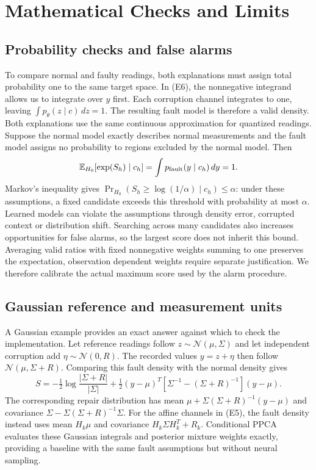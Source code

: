 \documentclass{llncs}
\newcommand{\E}{\mathbb{E}}
\newcommand{\1}{\mathbf{1}}
\begin{document}
\section{Mathematical Checks and Limits}

\subsection{Probability checks and false alarms}
To compare normal and faulty readings, both explanations must assign total probability one to the same target space. In (E6), the nonnegative integrand allows us to integrate over $y$ first. Each corruption channel integrates to one, leaving $\int p_\theta(z\mid c)\,dz=1$. The resulting fault model is therefore a valid density. Both explanations use the same continuous approximation for quantized readings.
Suppose the normal model exactly describes normal measurements and the fault model assigns no probability to regions excluded by the normal model. Then
\[
 \E_{H_0}[\exp(S_h)\mid c_h]
 =\int p_{\rm fault}(y\mid c_h)\,dy=1.
\]
Markov's inequality gives
$\Pr_{H_0}(S_h\geq\log(1/\alpha)\mid c_h)\leq\alpha$:
under these assumptions, a fixed candidate exceeds this threshold with probability at most $\alpha$. Learned models can violate the assumptions through density error, corrupted context or distribution shift. Searching across many candidates also increases opportunities for false alarms, so the largest score does not inherit this bound. Averaging valid ratios with fixed nonnegative weights summing to one preserves the expectation, observation dependent weights require separate justification. We therefore calibrate the actual maximum score used by the alarm procedure.

\subsection{Gaussian reference and measurement units}
A Gaussian example provides an exact answer against which to check the implementation. Let reference readings follow $z\sim\mathcal N(\mu,\Sigma)$ and let independent corruption add $\eta\sim\mathcal N(0,R)$. The recorded values $y=z+\eta$ then follow $\mathcal N(\mu,\Sigma+R)$. Comparing this fault density with the normal density gives
\[
 S=-\tfrac12\log\frac{|\Sigma+R|}{|\Sigma|}
 +\tfrac12(y-\mu)^T
 [\Sigma^{-1}-(\Sigma+R)^{-1}](y-\mu).
\]
The corresponding repair distribution has mean
$\mu+\Sigma(\Sigma+R)^{-1}(y-\mu)$
and covariance
$\Sigma-\Sigma(\Sigma+R)^{-1}\Sigma$.
For the affine channels in (E5), the fault density instead uses mean $H_k\mu$ and covariance $H_k\Sigma H_k^T+R_k$. Conditional PPCA evaluates these Gaussian integrals and posterior mixture weights exactly, providing a baseline with the same fault assumptions but without neural sampling.
\end{document}
